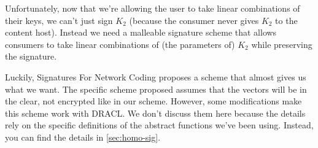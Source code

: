 \documentclass[pdftex,12pt,a4papaer,twoside,notitlepage]{report}
\begin{document}
Unfortunately, now that we're allowing the user to take linear combinations of
their keys, we can't just sign $K_2$ (because the consumer never gives $K_2$ to
the content host). Instead we need a malleable signature scheme that allows
consumers to take linear combinations of (the parameters of) $K_2$ while
preserving the signature.

Luckily, Signatures For Network Coding\cite{signature} proposes a scheme that
almost gives us what we want. The specific scheme proposed assumes that the
vectors will be in the clear, not encrypted like in our scheme. However, some
modifications make this scheme work with DRACL. We don't discuss them here
because the details rely on the specific definitions of the abstract functions
we've been using. Instead, you can find the details in \cref{sec:homo-sig}.

\end{document}
